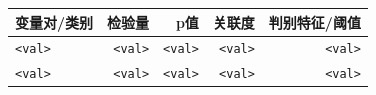 \begin{tabular}{lrrrr}
\toprule
\textbf{变量对/类别} & \textbf{检验量} & \textbf{p值} & \textbf{关联度} & \textbf{判别特征/阈值} \\\midrule
\texttt{<val>} & \texttt{<val>} & \texttt{<val>} & \texttt{<val>} & \texttt{<val>} \\
\texttt{<val>} & \texttt{<val>} & \texttt{<val>} & \texttt{<val>} & \texttt{<val>} \\\bottomrule
\end{tabular}
